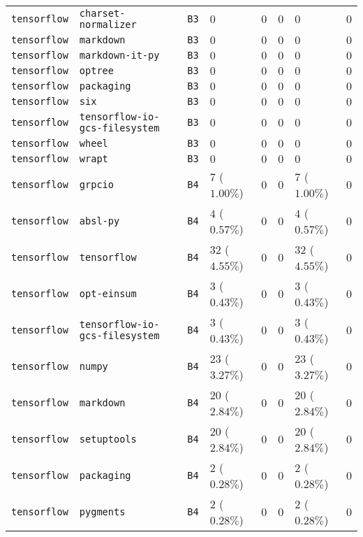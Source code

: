 \begin{table}
\begin{tabular}{llllllll}
\texttt{tensorflow} & \texttt{charset-normalizer} & \texttt{B3} & $0$ & $0$ & $0$ & $0$ & $0$ \\
\texttt{tensorflow} & \texttt{markdown} & \texttt{B3} & $0$ & $0$ & $0$ & $0$ & $0$ \\
\texttt{tensorflow} & \texttt{markdown-it-py} & \texttt{B3} & $0$ & $0$ & $0$ & $0$ & $0$ \\
\texttt{tensorflow} & \texttt{optree} & \texttt{B3} & $0$ & $0$ & $0$ & $0$ & $0$ \\
\texttt{tensorflow} & \texttt{packaging} & \texttt{B3} & $0$ & $0$ & $0$ & $0$ & $0$ \\
\texttt{tensorflow} & \texttt{six} & \texttt{B3} & $0$ & $0$ & $0$ & $0$ & $0$ \\
\texttt{tensorflow} & \texttt{tensorflow-io-gcs-filesystem} & \texttt{B3} & $0$ & $0$ & $0$ & $0$ & $0$ \\
\texttt{tensorflow} & \texttt{wheel} & \texttt{B3} & $0$ & $0$ & $0$ & $0$ & $0$ \\
\texttt{tensorflow} & \texttt{wrapt} & \texttt{B3} & $0$ & $0$ & $0$ & $0$ & $0$ \\
\texttt{tensorflow} & \texttt{grpcio} & \texttt{B4} & $7$ ($1.00\%$) & $0$ & $0$ & $7$ ($1.00\%$) & $0$ \\
\texttt{tensorflow} & \texttt{absl-py} & \texttt{B4} & $4$ ($0.57\%$) & $0$ & $0$ & $4$ ($0.57\%$) & $0$ \\
\texttt{tensorflow} & \texttt{tensorflow} & \texttt{B4} & $32$ ($4.55\%$) & $0$ & $0$ & $32$ ($4.55\%$) & $0$ \\
\texttt{tensorflow} & \texttt{opt-einsum} & \texttt{B4} & $3$ ($0.43\%$) & $0$ & $0$ & $3$ ($0.43\%$) & $0$ \\
\texttt{tensorflow} & \texttt{tensorflow-io-gcs-filesystem} & \texttt{B4} & $3$ ($0.43\%$) & $0$ & $0$ & $3$ ($0.43\%$) & $0$ \\
\texttt{tensorflow} & \texttt{numpy} & \texttt{B4} & $23$ ($3.27\%$) & $0$ & $0$ & $23$ ($3.27\%$) & $0$ \\
\texttt{tensorflow} & \texttt{markdown} & \texttt{B4} & $20$ ($2.84\%$) & $0$ & $0$ & $20$ ($2.84\%$) & $0$ \\
\texttt{tensorflow} & \texttt{setuptools} & \texttt{B4} & $20$ ($2.84\%$) & $0$ & $0$ & $20$ ($2.84\%$) & $0$ \\
\texttt{tensorflow} & \texttt{packaging} & \texttt{B4} & $2$ ($0.28\%$) & $0$ & $0$ & $2$ ($0.28\%$) & $0$ \\
\texttt{tensorflow} & \texttt{pygments} & \texttt{B4} & $2$ ($0.28\%$) & $0$ & $0$ & $2$ ($0.28\%$) & $0$ \\

\end{tabular}
\end{table}
